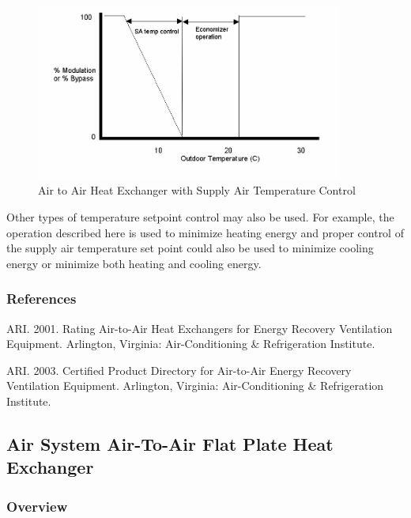 \begin{figure}[hbtp] %
\centering
\includegraphics[width=0.9\textwidth, height=0.9\textheight, keepaspectratio=true]{media/image5550.png}
\caption{Air to Air Heat Exchanger with Supply Air Temperature Control \protect \label{fig:air-to-air-heat-exchanger-with-supply-air}}
\end{figure}

Other types of temperature setpoint control may also be used. For example, the operation described here is used to minimize heating energy and proper control of the supply air temperature set point could also be used to minimize cooling energy or minimize both heating and cooling energy.

\subsubsection{References}\label{references-027}

ARI. 2001. Rating Air-to-Air Heat Exchangers for Energy Recovery Ventilation Equipment. Arlington, Virginia: Air-Conditioning \& Refrigeration Institute.

ARI. 2003. Certified Product Directory for Air-to-Air Energy Recovery Ventilation Equipment. Arlington, Virginia: Air-Conditioning \& Refrigeration Institute.

\subsection{Air System Air-To-Air Flat Plate Heat Exchanger}\label{air-system-air-to-air-flat-plate-heat-exchanger}

\subsubsection{Overview}\label{overview-1-007}

